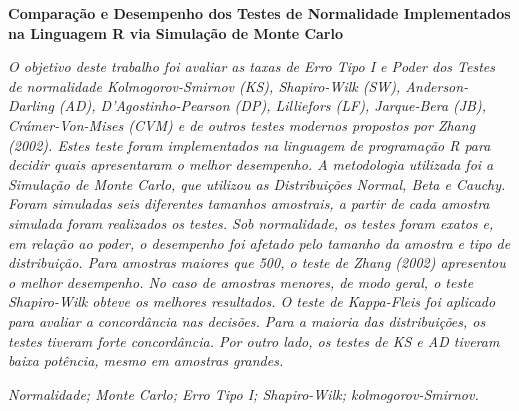 \documentclass[a4paper,11pt]{article} %
\begin{document}
\pagestyle{fancy}
\setcounter{page}{1}
\renewcommand{\thefootnote}{$\dagger$}
\lfoot{}
\rfoot{}
\setpagewiselinenumbers
\modulolinenumbers[1]
\linenumbers

\begin{center}
    {\large {\bf Comparação e Desempenho dos Testes de Normalidade Implementados na Linguagem R via Simulação de Monte Carlo}}\vspace{0.3cm} 
\end{center}
\begin{small}
 { \it
    O objetivo deste trabalho foi avaliar as taxas de Erro Tipo I e Poder dos Testes de normalidade Kolmogorov-Smirnov (KS), Shapiro-Wilk (SW), Anderson-Darling (AD), D’Agostinho-Pearson (DP), Lilliefors (LF), Jarque-Bera (JB), Crámer-Von-Mises (CVM) e de outros testes modernos propostos por Zhang (2002). Estes teste foram implementados na linguagem de programação R para decidir quais apresentaram o melhor desempenho. A metodologia utilizada foi a Simulação de Monte Carlo, que utilizou as Distribuições Normal, Beta e Cauchy. Foram simuladas seis diferentes tamanhos amostrais, a partir de cada amostra simulada foram realizados os testes. Sob normalidade, os testes foram exatos e, em relação ao poder, o desempenho foi afetado pelo tamanho da amostra e tipo de distribuição. Para amostras maiores que 500, o teste de Zhang (2002) apresentou o melhor desempenho. No caso de amostras menores, de modo geral, o teste Shapiro-Wilk obteve os melhores resultados. O teste de Kappa-Fleis foi aplicado para avaliar a concordância nas decisões. Para a maioria das distribuições, os testes tiveram forte concordância. Por outro lado, os testes de KS e AD tiveram baixa potência, mesmo em amostras grandes.
}

\vspace{0.5cm}

 {\it Normalidade; Monte Carlo; Erro Tipo I; Shapiro-Wilk; kolmogorov-Smirnov.}\vspace{0.3cm}
\end{small}
\end{document}
